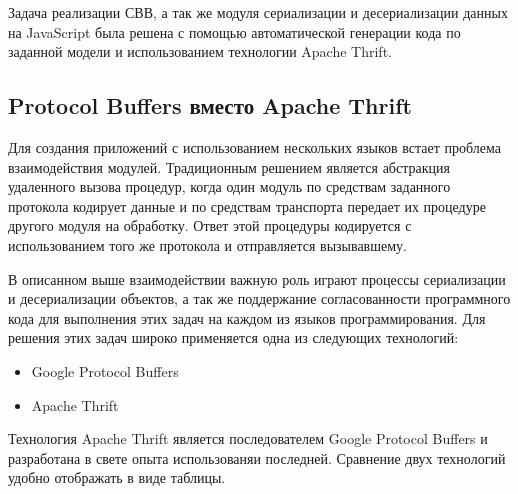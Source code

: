 Задача реализации СВВ, а так же модуля сериализации и десериализации данных на
JavaScript была решена с помощью автоматической генерации кода по заданной
модели и использованием технологии Apache Thrift.

\subsection{Protocol Buffers вместо Apache Thrift}

Для создания приложений с использованием нескольких языков встает проблема
взаимодействия модулей. Традиционным решением является абстракция удаленного
вызова процедур, когда один модуль по средствам заданного протокола кодирует
данные и по средствам транспорта передает их процедуре другого модуля на
обработку. Ответ этой процедуры
кодируется с использованием того же протокола и отправляется вызывавшему.

В описанном выше взаимодействии важную роль играют процессы сериализации и
десериализации
объектов, а так же поддержание согласованности программного кода для выполнения
этих задач на каждом из языков программирования. Для решения этих задач широко
применяется одна из следующих технологий:

\begin{itemize}
    \item Google Protocol Buffers
    \item Apache Thrift
\end{itemize}

Технология Apache Thrift является последователем Google
Protocol Buffers и разработана в свете опыта использованяи последней. Сравнение
двух технологий удобно отображать в виде таблицы.

\begin{center}
\end{center}

